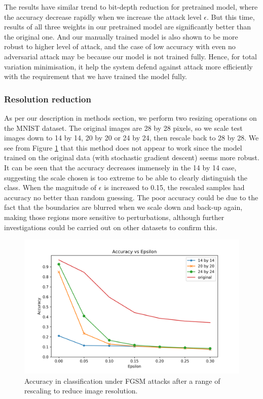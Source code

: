 The results have similar trend to bit-depth reduction for pretrained model, where the accuracy decrease rapidly when we increase the attack level $\epsilon$. But this time, results of all three weights in our pretrained model are significantly better than the original one.  And our manually trained model is also shown to be more robust to higher level of attack, and the case of low accuracy with even no adversarial attack may be because our model is not trained fully. Hence, for total variation minimisation, it help the system defend against attack more efficiently with the requirement that we have trained the model fully. 



\subsubsection{Resolution reduction}

As per our description in methods section, we perform two resizing operations on the MNIST dataset. The original images are 28 by 28 pixels, so we scale test images down to 14 by 14, 20 by 20 or 24 by 24, then rescale back to 28 by 28.  We see from Figure \ref{fig:resolution} that this method does not appear to work since the model trained on the original data (with stochastic gradient descent) seems more robust. It can be seen that the accuracy decreases immensely in the 14 by 14 case, suggesting the scale chosen is too extreme to be able to clearly distinguish the class. When the magnitude of \(\epsilon\) is increased to 0.15, the rescaled samples had accuracy no better than random guessing. The poor accuracy could be due to the fact that the boundaries are blurred when we scale down and back-up again, making those regions more sensitive to perturbations, although further investigations could be carried out on other datasets to confirm this.

\begin{figure}[h!]
\includegraphics[width=\textwidth]{rescaled_adam}
		\caption{Accuracy in classification under FGSM attacks after a range of rescaling to reduce image resolution.}
		\label{fig:resolution}

\end{figure}

